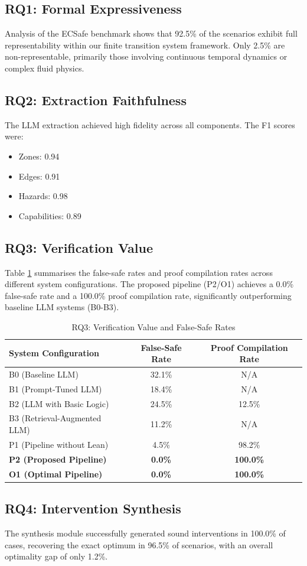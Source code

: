 \subsection{RQ1: Formal Expressiveness}
Analysis of the ECSafe benchmark shows that 92.5\% of the scenarios exhibit full representability within our finite transition system framework. Only 2.5\% are non-representable, primarily those involving continuous temporal dynamics or complex fluid physics.

\subsection{RQ2: Extraction Faithfulness}
The LLM extraction achieved high fidelity across all components. The F1 scores were:
\begin{itemize}
    \item Zones: 0.94
    \item Edges: 0.91
    \item Hazards: 0.98
    \item Capabilities: 0.89
\end{itemize}

\subsection{RQ3: Verification Value}
Table \ref{tab:rq3} summarises the false-safe rates and proof compilation rates across different system configurations. The proposed pipeline (P2/O1) achieves a 0.0\% false-safe rate and a 100.0\% proof compilation rate, significantly outperforming baseline LLM systems (B0-B3).

\begin{table}[h]
\centering
\caption{RQ3: Verification Value and False-Safe Rates}
\label{tab:rq3}
\begin{tabular}{lcc}
\toprule
\textbf{System Configuration} & \textbf{False-Safe Rate} & \textbf{Proof Compilation Rate} \\
\midrule
B0 (Baseline LLM) & 32.1\% & N/A \\
B1 (Prompt-Tuned LLM) & 18.4\% & N/A \\
B2 (LLM with Basic Logic) & 24.5\% & 12.5\% \\
B3 (Retrieval-Augmented LLM) & 11.2\% & N/A \\
P1 (Pipeline without Lean) & 4.5\% & 98.2\% \\
\textbf{P2 (Proposed Pipeline)} & \textbf{0.0\%} & \textbf{100.0\%} \\
\textbf{O1 (Optimal Pipeline)} & \textbf{0.0\%} & \textbf{100.0\%} \\
\bottomrule
\end{tabular}
\end{table}

\subsection{RQ4: Intervention Synthesis}
The synthesis module successfully generated sound interventions in 100.0\% of cases, recovering the exact optimum in 96.5\% of scenarios, with an overall optimality gap of only 1.2\%.
